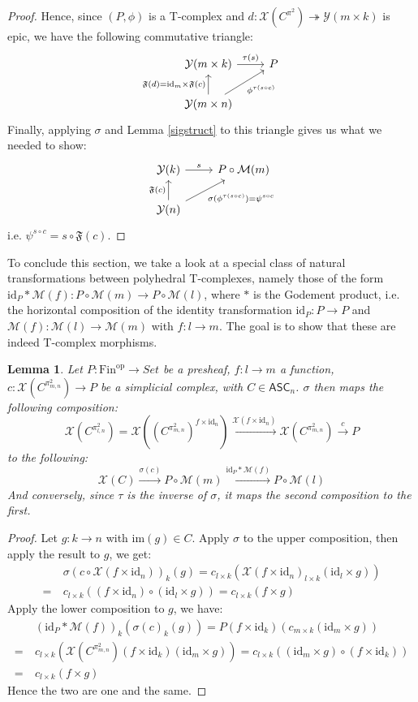 \documentclass{article}
\newtheorem{lemma}{Lemma}[subsection]
\theoremstyle{remark}
\theoremstyle{definition}
\newcommand{\Fin}{\mathrm{Fin}}
\newcommand{\op}{\mathrm{op}}
\newcommand{\ASC}{\mathsf{ASC}}
\newcommand{\im}{\mathrm{im}}
\newcommand{\id}{\mathrm{id}}
\newcommand{\Y}{\mathcal Y}
\newcommand{\X}{\mathcal X}
\newcommand{\F}{\mathfrak F}
\newcommand{\M}{\mathcal M}
\begin{document}
\begin{proof}
		Hence, since $(P,\phi)$ is a T-complex and $d:\X(C^{\pi^2})\twoheadrightarrow\Y(m\times k)$ is epic, we have the following commutative triangle:
		\[\begin{tikzcd}
			\Y(m\times k)\arrow{r}{\tau(s)}&P\\
			\Y(m\times n)\arrow{u}{\F(d)=\id_m\times\F(c)}\arrow{ur}[swap]{\phi^{\tau(s\circ c)}}
		\end{tikzcd}\]
		Finally, applying $\sigma$ and Lemma \ref{sigstruct} to this triangle gives us what we needed to show:
		\[\begin{tikzcd}
			\Y(k)\arrow{r}{s}&P\circ\M(m)\\
			\Y(n)\arrow{u}{\F(c)}\arrow{ur}[swap]{\sigma(\phi^{\tau(s\circ c)})=\psi^{s\circ c}}
		\end{tikzcd}\]
		i.e. $\psi^{s\circ c} = s\circ \F(c)$.
	\end{proof}
	To conclude this section, we take a look at a special class of natural transformations between polyhedral T-complexes, namely those of the form $\id_P*\M(f):P\circ\M(m)\to P\circ\M(l)$, where $*$ is the Godement product, i.e. the horizontal composition of the identity transformation $\id_P:P\to P$ and $\M(f):\M(l)\to\M(m)$ with $f:l\to m$. The goal is to show that these are indeed T-complex morphisms.
	\begin{lemma}\label{sigexch}
		Let $P:\Fin^\op\to Set$ be a presheaf, $f:l\to m$ a function, $c:\X(C^{\pi^2_{m,n}})\to P$ be a simplicial complex, with $C\in\ASC_n$. $\sigma$ then maps the following composition:
		\[\X(C^{\pi^2_{l,n}})=\X((C^{\pi^2_{m,n}})^{f\times\id_n})\xrightarrow{\X(f\times\id_n)}\X(C^{\pi^2_{m,n}})\xrightarrow{c}P\]
		to the following:
		\[\X(C)\xrightarrow{\sigma(c)}P\circ\M(m)\xrightarrow{\id_P*\M(f)}P\circ\M(l)\]
		And conversely, since $\tau$ is the inverse of $\sigma$, it maps the second composition to the first.
	\end{lemma}
	\begin{proof}
		Let $g:k\to n$ with $\im(g)\in C$. Apply $\sigma$ to the upper composition, then apply the result to $g$, we get:
		\begin{align*}
			&\sigma(c\circ\X(f\times\id_n))_k(g)=c_{l\times k}(\X(f\times\id_n)_{l\times k}(\id_l\times g))\\
			=\ &c_{l\times k}((f\times\id_n)\circ(\id_l\times g))=c_{l\times k}(f\times g)
		\end{align*}
		Apply the lower composition to $g$, we have:
		\begin{align*}
			&(\id_P*\M(f))_k(\sigma(c)_k(g))=P(f\times\id_k)(c_{m\times k}(\id_m\times g))\\
			=\ &c_{l\times k}(\X(C^{\pi^2_{m,n}})(f\times\id_k)(\id_m\times g))=c_{l\times k}((\id_m\times g)\circ(f\times\id_k))\\
			=\ &c_{l\times k}(f\times g)
		\end{align*}
		Hence the two are one and the same.
	\end{proof}
\end{document}
